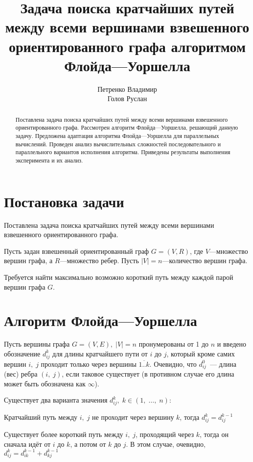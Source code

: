 \documentclass{article}
\newenvironment{itemize*}%
	{\begin{itemize}[topsep=0pt, partopsep=0pt, itemsep=0pt,parsep=0pt]}	
	{\end{itemize}}
\begin{document}
	
\title{Задача поиска кратчайших путей между всеми вершинами взвешенного ориентированного графа алгоритмом Флойда---Уоршелла}
\author{Петренко Владимир\\Голов Руслан}


\begin{titlepage}
	\maketitle
	\begin{abstract}
		Поставлена задача поиска кратчайших путей между всеми вершинами взвешенного ориентированного графа. Рассмотрен алгоритм Флойда---Уоршелла, решающий данную задачу. Предложена адаптация алгоритма Флойда---Уоршелла для параллельных вычислений. Проведен анализ вычислительных сложностей последовательного и параллельного вариантов исполнения алгоритма. Приведены результаты выполнения эксперимента и их анализ.
	\end{abstract}
\end{titlepage}



\section{Постановка задачи}

	Поставлена задача поиска кратчайших путей между всеми вершинами взвешенного ориентированного графа.
	
	Пусть задан взвешенный ориентированный граф \(G=(V,R)\), где \(V\)---множество вершин графа, а \(R\)---множество ребер. Пусть \(|V|=n\)---количество вершин графа.
	
	Требуется найти максимально возможно короткий путь между каждой парой вершин графа \(G\).

\section{Алгоритм Флойда---Уоршелла}

	Пусть вершины графа \(G=(V, E),\; |V| = n\) пронумерованы от 1 до \(n\) и введено обозначение \(d_{i j}^{k}\) для длины кратчайшего пути от \(i\) до \(j\), который кроме самих вершин \(i,\; j\) проходит только через вершины \(\overline{1..k}\). Очевидно, что \(d_{i j}^{0}\) — длина (вес) ребра \((i,\;j)\), если таковое существует (в противном случае его длина может быть обозначена как \(\infty\)).
	
	Существует два варианта значения \(d_{i j}^{k},\;k \in (1,\;\ldots,\;n)\):
	\begin{itemize*}
		\item Кратчайший путь между \(i,\;j\) не проходит через вершину \(k\), тогда \(d_{i j}^{k}=d_{i j}^{k-1}\)
		\item Существует более короткий путь между \(i,\;j\), проходящий через \(k\), тогда он сначала идёт от \(i\) до \(k\), а потом от \(k\) до \(j\). В этом случае, очевидно, \(d_{i j}^{k}=d_{i k}^{k-1} + d_{k j}^{k-1}\)
	\end{itemize*}
	
\end{document}
